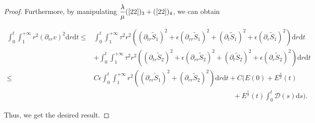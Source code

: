 \documentclass[10pt,reqno]{amsart}
\numberwithin{equation}{section}
\begin{document}
\begin{proof}
		Furthermore, by manipulating $\dfrac{\lambda}{\mu}(\ref{22})_{3}+(\ref{22})_{4}$, we can obtain
		
		\begin{equation*}%
			\begin{aligned}
				\int_0^t\int_{1}^{+\infty}r^2(\partial_{rr}v)^2
				\mathrm{d}r\mathrm{d}t
				\leq&\int_0^t\int_{1}^{+\infty}\tau^2r^2((\partial_{tr}\tilde{S}_1)^2+\epsilon(\partial_{rr}\tilde{S}_1)^2+(\partial_{t}\tilde{S}_1)^2+\epsilon(\partial_{r}\tilde{S}_1)^2)\mathrm{d}r\mathrm{d}t\\
				&+\int_0^t\int_{1}^{+\infty}\tau^2r^2((\partial_{tr}\tilde{S}_2)^2+\epsilon(\partial_{rr}\tilde{S}_2)^2+(\partial_{t}\tilde{S}_2)^2+\epsilon(\partial_{r}\tilde{S}_2)^2)\mathrm{d}r\mathrm{d}t\\
				\leq& C\epsilon\int_{0}^{t}\int_{1}^{+\infty}r^2((\partial_{rr}\tilde{S}_1)^2+(\partial_{rr}\tilde{S}_2)^2)\mathrm{d}r\mathrm{d}t
				+C\bigg(E(0)+E^{\frac{3}{2}}(t)\\
				&\qquad\qquad\qquad\qquad\qquad\qquad\qquad\qquad\qquad\qquad+E^{\frac{1}{2}}(t)\int_{0}^{t} \mathcal{D}(s)\mathrm{d}s\bigg).
			\end{aligned}
		\end{equation*}
		
		Thus,  we get the desired result.
	\end{proof}
	
\end{document}
